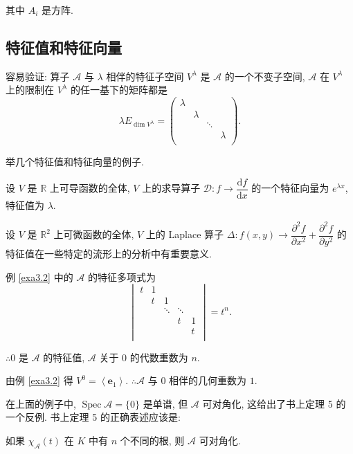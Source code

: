 \documentclass{ctexart}
\begin{document}
其中 $A_i$ 是方阵.
\subsection{特征值和特征向量}
容易验证: 算子 $\mathcal{A}$ 与 $\lambda$ 相伴的特征子空间 $V^\lambda$ 是 $\mathcal{A}$ 的一个不变子空间, $\mathcal{A}$ 在 $V^\lambda$ 上的限制在 $V^\lambda$ 的任一基下的矩阵都是
\[\lambda E_{\dim V^\lambda}=\begin{pmatrix}
    \lambda \\
    & \lambda \\
    && \ddots \\
    &&& \lambda \\
\end{pmatrix}.\]

举几个特征值和特征向量的例子.
\begin{example}
    设 $V$ 是 $\mathbb{R}$ 上可导函数的全体, $V$ 上的求导算子 $\mathcal{D}:f\to \dfrac{\mathrm{d}f}{\mathrm{d}x}$ 的一个特征向量为 $e^{\lambda x}$, 特征值为 $\lambda$.
\end{example}
\begin{example}
    设 $V$ 是 $\mathbb{R}^2$ 上可微函数的全体, $V$ 上的 Laplace 算子 $\Delta:f(x,y)\to\dfrac{\partial^2f}{\partial x^2}+\dfrac{\partial^2f}{\partial y^2}$ 的特征值在一些特定的流形上的分析中有重要意义.
\end{example}
\begin{example}
    例 \ref{exa3.2} 中的 $\mathcal{A}$ 的特征多项式为
    \[\begin{vmatrix}
        t & 1 \\
        & t & 1 \\
        && \ddots & \ddots \\
        &&& t & 1 \\
        &&&& t \\
    \end{vmatrix}=t^n.\]

    $\therefore0$ 是 $\mathcal{A}$ 的特征值, $\mathcal{A}$ 关于 $0$ 的代数重数为 $n$.

    由例 \ref{exa3.2} 得 $V^0=\left<\boldsymbol{e}_1\right>$. $\therefore\mathcal{A}$ 与 $0$ 相伴的几何重数为 $1$.
\end{example}
在上面的例子中, $\operatorname{Spec}\mathcal{A}=\{0\}$ 是单谱, 但 $\mathcal{A}$ 可对角化, 这给出了书上定理 5 的一个反例. 书上定理 5 的正确表述应该是:
\begin{theorem}\label{t3.2}
    如果 $\chi_{\mathcal{A}}(t)$ 在 $K$ 中有 $n$ 个不同的根, 则 $\mathcal{A}$ 可对角化.
\end{theorem}
\end{document}
